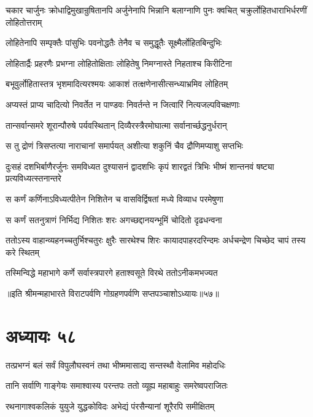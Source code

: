 \onelineshloka
{चकार चार्जुनः क्रोधाद्विमुखान्रुषितानपि}
\twolineshloka
{अर्जुनेनापि भिन्नानि बलाग्नाणि पुनः क्वचित्}
{चक्रुर्लोहितधाराभिर्धरणीं लोहितोत्तराम्}


\twolineshloka
{लोहितेनापि सम्पृक्तैः पांसुभिः पवनोद्धतैः}
{तेनैव च समुद्धूतैः सूक्ष्मैर्लोहितबिन्दुभिः}


\twolineshloka
{लोहितार्द्रैः प्रहरणैः प्रभग्ना लोहितोक्षिताः}
{लोहितेषु निमग्नास्ते निहताश्च किरीटिना}


\twolineshloka
{बभूवुर्लोहितास्तत्र भृशमादित्यरश्मयः}
{आकाशं तत्क्षणेनासीत्सन्ध्याभ्रमिव लोहितम्}


\twolineshloka
{अप्यस्तं प्राप्य चादित्यो निवर्तेत न पाण्डवः}
{निवर्तन्ते न जित्वारिं नित्यजल्पविचक्षणाः}


\twolineshloka
{तान्सर्वान्समरे शूरान्पौरुषे पर्यवस्थितान्}
{दिव्यैरस्त्रैरमोघात्मा सर्वानार्च्छद्धनुर्धरान्}


\twolineshloka
{स तु द्रोणं त्रिसप्तत्या नाराचानां समार्पयत्}
{अशीत्या शकुनिं चैव द्रौणिमप्याशु सप्तभिः}


\threelineshloka
{दुःसहं दशभिर्बाणैरर्जुनः समविध्यत}
{दुश्यासनं द्वादशभिः कृपं शारद्वतं त्रिभिः}
{भीष्मं शान्तनवं षष्ट्या प्रत्यविध्यत्स्तनान्तरे}


\twolineshloka
{स कर्णं कर्णिनाऽविध्यत्पीतेन निशितेन च}
{वासविर्द्विषतां मध्ये विव्याध परमेषुणा}


\twolineshloka
{स कर्णं सतनुत्राणं निर्भिद्य निशितः शरः}
{अगच्छद्दानयन्भूमिं चोदितो दृढधन्वना}


\threelineshloka
{ततोऽस्य वाहान्व्यहनच्चतुर्भिश्चतुरः क्षुरैः}
{सारथेश्च शिरः कायादपाहरदरिन्दमः}
{अर्धचन्द्रेण चिच्छेद चापं तस्य करे स्थितम्}


\twolineshloka
{तस्मिन्विद्धे महाभागे कर्णे सर्वास्त्रपारगे}
{हताश्वसूते विरथे ततोऽनीकमभज्यत}

॥इति श्रीमन्महाभारते विराटपर्वणि गोग्रहणपर्वणि सप्तपञ्चाशोऽध्यायः॥५७॥

\chapter{अध्यायः ५८}

\twolineshloka
{तत्प्रभग्नं बलं सर्वं विपुलौघस्वनं तथा}
{भीष्ममासाद्य सन्तस्थौ वेलामिव महोदधिः}


\twolineshloka
{तानि सर्वाणि गाङ्गेयः समाश्वास्य परन्तपः}
{ततो व्यूह्य महाबाहुः समरेष्वपराजितः}


\twolineshloka
{रथनागाश्वकलिकं युयुजे युद्धकोविदः}
{अभेद्यं पंरसैन्यानां शूरैरपि समीक्षितम्}



